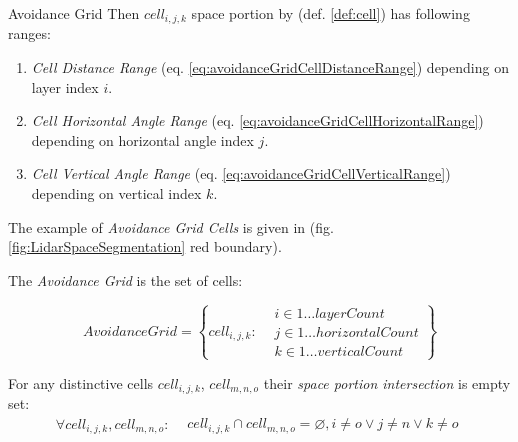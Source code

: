 \begin{definition}{Avoidance Grid}
\noindent Then $cell_{i,j,k}$ space portion by (def. \ref{def:cell}) has following ranges:
\begin{enumerate}
    \item \emph{Cell Distance Range} (eq. \ref{eq:avoidanceGridCellDistanceRange}) depending on layer index $i$.
    
    \item \emph{Cell Horizontal Angle Range} (eq. \ref{eq:avoidanceGridCellHorizontalRange}) depending on horizontal angle index $j$.
    
    \item \emph{Cell Vertical Angle Range} (eq. \ref{eq:avoidanceGridCellVerticalRange}) depending on vertical index $k$.
\end{enumerate}

\begin{note}
	The example of \emph{Avoidance Grid Cells} is given in (fig. \ref{fig:LidarSpaceSegmentation} red boundary).
\end{note} 

The \emph{Avoidance Grid} is the set of cells:

\begin{equation}\label{eq:avoidanceGridCellSpace}
    Avoidance Grid = \left\{
    					cell_{i,j,k}:
    					\begin{aligned}
    						& i \in 1 \dots layer Count\\
    						& j \in 1 \dots horizontal Count\\
    						& k \in 1 \dots vertical Count
    					\end{aligned} 
                     \right\}
\end{equation}

\begin{note}
	For any distinctive cells $cell_{i,j,k}$, $cell_{m,n,o}$ their \emph{space portion intersection} is empty set:
	\begin{equation}
		\forall cell_{i,j,k}, cell_{m,n,o}:
		\begin{aligned}
		    &cell_{i,j,k}\cap cell_{m,n,o} = \varnothing,
		    i \neq o \lor j \neq n \lor k \neq o
		\end{aligned}
	\end{equation}
\end{note}
\end{definition}


